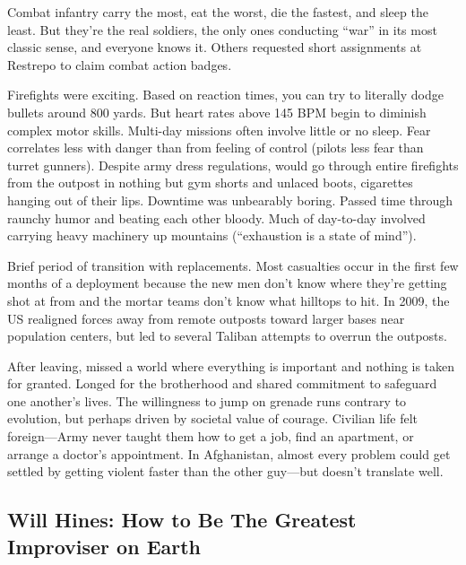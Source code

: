 \documentclass[
]{article}
\begin{document}
Combat infantry carry the most, eat the worst, die the fastest, and
sleep the least. But they're the real soldiers, the only ones conducting
``war'' in its most classic sense, and everyone knows it. Others
requested short assignments at Restrepo to claim combat action badges.

Firefights were exciting. Based on reaction times, you can try to
literally dodge bullets around 800 yards. But heart rates above 145 BPM
begin to diminish complex motor skills. Multi-day missions often involve
little or no sleep. Fear correlates less with danger than from feeling
of control (pilots less fear than turret gunners). Despite army dress
regulations, would go through entire firefights from the outpost in
nothing but gym shorts and unlaced boots, cigarettes hanging out of
their lips. Downtime was unbearably boring. Passed time through raunchy
humor and beating each other bloody. Much of day-to-day involved
carrying heavy machinery up mountains (``exhaustion is a state of
mind'').

Brief period of transition with replacements. Most casualties occur in
the first few months of a deployment because the new men don't know
where they're getting shot at from and the mortar teams don't know what
hilltops to hit. In 2009, the US realigned forces away from remote
outposts toward larger bases near population centers, but led to several
Taliban attempts to overrun the outposts.

After leaving, missed a world where everything is important and nothing
is taken for granted. Longed for the brotherhood and shared commitment
to safeguard one another's lives. The willingness to jump on grenade
runs contrary to evolution, but perhaps driven by societal value of
courage. Civilian life felt foreign---Army never taught them how to get
a job, find an apartment, or arrange a doctor's appointment. In
Afghanistan, almost every problem could get settled by getting violent
faster than the other guy---but doesn't translate well.

\hypertarget{will-hines-how-to-be-the-greatest-improviser-on-earth}{%
\subsection{Will Hines: How to Be The Greatest Improviser on
Earth}\label{will-hines-how-to-be-the-greatest-improviser-on-earth}}
\end{document}
